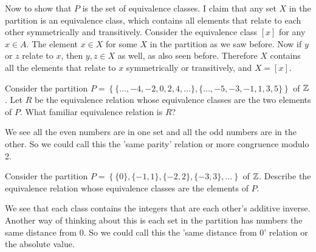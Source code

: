 \documentclass{article}
\begin{document}
Now to show that $P$ is the set of equivalence classes. I claim that any set $X$ in the partition is an equivalence class, which contains all elements that relate to each other symmetrically and transitively. Consider the equivalence class $[x]$ for any $x \in A$. The element $x \in X$ for some $X$ in the partition as we saw before. Now if $y$ or $z$ relate to $x$, then $y, z \in X$ as well, as also seen before. Therefore $X$ contains all the elements that relate to $x$ symmetrically or transitively, and $X = [x]$.

\begin{problem}
Consider the partition $P = \left\{ \{\ldots, -4, -2, 0, 2, 4, \ldots\}, \{\ldots, -5, -3, -1, 1, 3, 5\}\right\}$ of $\mathbb{Z}$. Let $R$ be the equivalence relation whose equivalence classes are the two elements of $P$. What familiar equivalence relation is $R$?
\end{problem}

We see all the even numbers are in one set and all the odd numbers are in the other. So we could call this the 'same parity' relation or more congruence modulo 2.

\begin{problem}
Consider the partition $P = \left\{ \{0\}, \{-1, 1\}, \{-2, 2\}, \{-3, 3\}, \ldots\right\}$ of $\mathbb{Z}$. Describe the equivalence relation whose equivalence classes are the elements of $P$.
\end{problem}

We see that each class contains the integers that are each other's additive inverse. Another way of thinking about this is each set in the partition has numbers the same distance from 0. So we could call this the 'same distance from 0' relation or the absolute value.
\end{document}
